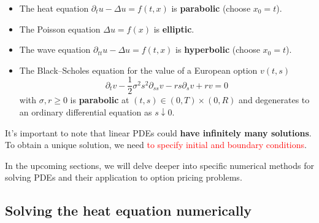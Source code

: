 \begin{itemize}
  \item The heat equation $\partial_t u - \Delta u = f(t, x)$ is \textbf{parabolic} (choose $x_0 = t$).
  \item The Poisson equation $\Delta u = f(x)$ is \textbf{elliptic}.
  \item The wave equation $\partial_{tt}u - \Delta u = f(t, x)$ is \textbf{hyperbolic} (choose $x_0 = t$).
  \item The Black–Scholes equation for the value of a European option $v(t, s)$
  \[\partial_t v - \frac{1}{2} \sigma^2 s^2 \partial_{ss}v - rs \partial_s v + rv = 0\]
  with $\sigma, r \geq 0$ is \textbf{parabolic} at $(t, s) \in (0, T) \times (0, R)$ and degenerates to an ordinary differential equation as $s \downarrow 0$.
\end{itemize}

It's important to note that linear PDEs could \textbf{have infinitely many solutions}. To obtain a unique solution, we need \textcolor{red}{to specify initial and boundary conditions}.

In the upcoming sections, we will delve deeper into specific numerical methods for solving PDEs and their application to option pricing problems.

\subsection{Solving the heat equation numerically}
